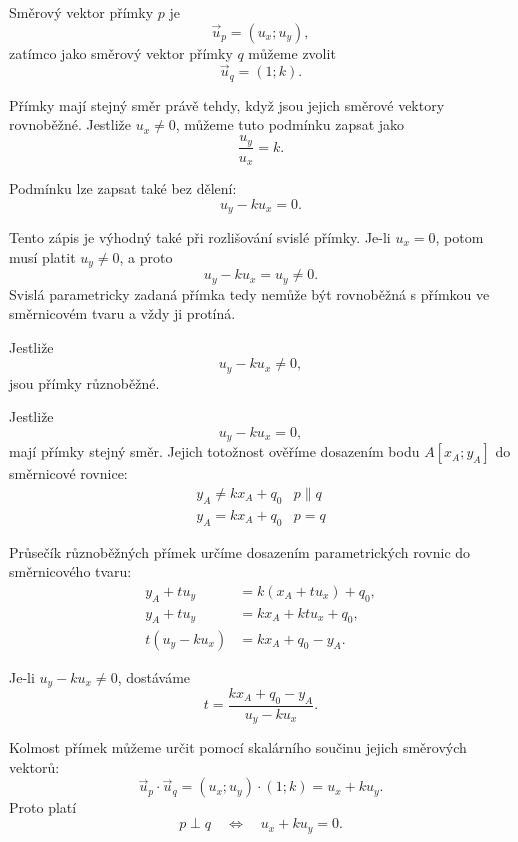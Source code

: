 Směrový vektor přímky $p$ je
\[
    \vec{u}_p=(u_x;u_y),
\]
zatímco jako směrový vektor přímky $q$ můžeme zvolit
\[
    \vec{u}_q=(1;k).
\]

Přímky mají stejný směr právě tehdy, když jsou jejich směrové vektory
rovnoběžné. Jestliže $u_x\neq0$, můžeme tuto podmínku zapsat jako
\[
    \frac{u_y}{u_x}=k.
\]

Podmínku lze zapsat také bez dělení:
\begin{equation}\label{eq:Mixed_parametric_slope_parallel_condition}
    u_y-ku_x=0.
\end{equation}

Tento zápis je výhodný také při rozlišování svislé přímky. Je-li
$u_x=0$, potom musí platit $u_y\neq0$, a proto
\[
    u_y-ku_x=u_y\neq0.
\]
Svislá parametricky zadaná přímka tedy nemůže být rovnoběžná s přímkou
ve směrnicovém tvaru a vždy ji protíná.

Jestliže
\[
    u_y-ku_x\neq0,
\]
jsou přímky různoběžné.

Jestliže
\[
    u_y-ku_x=0,
\]
mají přímky stejný směr. Jejich totožnost ověříme dosazením bodu
$A[x_A;y_A]$ do směrnicové rovnice:
\[
\begin{array}{c|c}
    y_A\neq kx_A+q_0
    &
    p\parallel q
    \\[1mm]
    y_A=kx_A+q_0
    &
    p=q
\end{array}
\]

Průsečík různoběžných přímek určíme dosazením parametrických rovnic
do směrnicového tvaru:
\begin{align*}
    y_A+t u_y
    &=
    k(x_A+t u_x)+q_0,\\
    y_A+t u_y
    &=
    kx_A+kt u_x+q_0,\\
    t(u_y-ku_x)
    &=
    kx_A+q_0-y_A.
\end{align*}

Je-li $u_y-ku_x\neq0$, dostáváme
\begin{equation}\label{eq:Mixed_parametric_slope_intersection_parameter}
    t
    =
    \frac{kx_A+q_0-y_A}{u_y-ku_x}.
\end{equation}

Kolmost přímek můžeme určit pomocí skalárního součinu jejich směrových
vektorů:
\[
    \vec{u}_p\cdot\vec{u}_q
    =
    (u_x;u_y)\cdot(1;k)
    =
    u_x+ku_y.
\]
Proto platí
\begin{equation}\label{eq:Mixed_parametric_slope_perpendicular_condition}
    p\perp q
    \quad\Longleftrightarrow\quad
    u_x+ku_y=0.
\end{equation}

